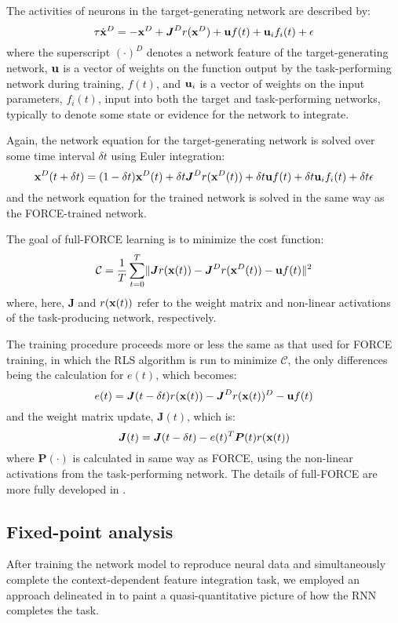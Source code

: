\documentclass[12pt,a4paper,final]{iopart}
\begin{document}
The activities of neurons in the target-generating network are described by:
\[
    \tau \dot{{\bf x}}^D = -{\bf x}^D + \boldsymbol{J}^D r({\bf x}^D) + {\bf u}f(t) + {\bf u}_i f_i(t) + {\bf \epsilon}
\]
where the superscript $(\cdot)^D$ denotes a network feature of the target-generating network, ${\bf u}$ is a vector of weights on the function output by the task-performing network during training, $f(t)$, and ${\bf u}_i$ is a vector of weights on the input parameters, $f_i(t)$, input into both the target and task-performing networks, typically to denote some state or evidence for the network to integrate.

Again, the network equation for the target-generating network is solved over some time interval $\delta t$ using Euler integration:
\[
    {\bf x}^D(t + \delta t) = (1 - \delta t) {\bf x}^D(t) + \delta t \boldsymbol{J}^D r({\bf x}^D(t)) + \delta t {\bf u}f(t) + \delta t {\bf u}_i f_i(t) + \delta t {\bf \epsilon}
\]
and the network equation for the trained network is solved in the same way as the FORCE-trained network.

The goal of full-FORCE learning is to minimize the cost function:
\[
    \mathcal{C} = \frac{1}{T} \sum_{t=0}^T \lVert \boldsymbol{J} r({\bf x}(t)) - \boldsymbol{J}^D r({\bf x}^D(t)) - {\bf u}f(t) \rVert ^2
\]
where, here, $\boldsymbol{J}$ and $r({\bf x}(t))$ refer to the weight matrix and non-linear activations of the task-producing network, respectively. 

The training procedure proceeds more or less the same as that used for FORCE training, in which the RLS algorithm is run to minimize $\mathcal{C}$, the only differences being the calculation for $e(t)$, which becomes:
\[
    e(t) = \boldsymbol{J}(t - \delta t) r({\bf x}(t)) - \boldsymbol{J}^D r({\bf x}(t))^D - {\bf u}f(t)
\]
and the weight matrix update, $\boldsymbol{J}(t)$, which is:
\[
    \boldsymbol{J}(t) = \boldsymbol{J}(t - \delta t) - e(t)^T \boldsymbol{P}(t) r({\bf x}(t))
\]
where $\boldsymbol{P}(\cdot)$ is calculated in same way as FORCE, using the non-linear activations from the task-performing network. The details of full-FORCE are more fully developed in \cite{DePasquale}.

\subsection{Fixed-point analysis}
After training the network model to reproduce neural data and simultaneously complete the context-dependent feature integration task, we employed an approach delineated in \cite{BarakSussillo} to paint a quasi-quantitative picture of how the RNN completes the task.
\end{document}
